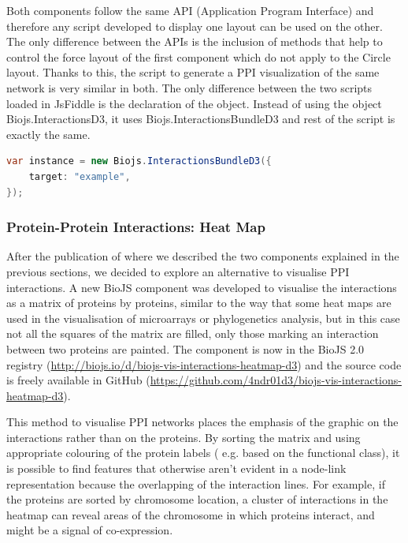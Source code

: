 Both components follow the same API (Application Program Interface) and therefore any script developed to display one layout can be used on the other. The only difference between the APIs is the inclusion of methods that help to control the force layout of the first component which do not apply to the Circle layout. Thanks to this, the script to generate a PPI visualization of the same network is very similar in both.  The only difference between the two scripts loaded in JsFiddle is the declaration of the object. Instead of using the object Biojs.InteractionsD3, it uses Biojs.InteractionsBundleD3 and rest of the script is exactly the same.
\begin{lstlisting}[language=java]
var instance = new Biojs.InteractionsBundleD3({
    target: "example",
});
\end{lstlisting}





\subsubsection{Protein-Protein Interactions: Heat Map} \label{subsubsec:ppi3_biojs}
After the publication of \cite{SAL2014} where we described the two components explained in the previous sections, we decided to explore an alternative to visualise PPI interactions. A new BioJS component was developed to visualise the interactions as a matrix of proteins by proteins, similar to the way that some heat maps are used in the visualisation of microarrays or phylogenetics analysis, but in this case not all the squares of the matrix are filled, only those marking an interaction between two proteins are painted. The component is now in the BioJS 2.0 registry (\url{http://biojs.io/d/biojs-vis-interactions-heatmap-d3}) and the source code is freely available in GitHub (\url{https://github.com/4ndr01d3/biojs-vis-interactions-heatmap-d3}).

This method to visualise PPI networks places the emphasis of the graphic on the interactions rather than on the proteins. By sorting the matrix and using appropriate colouring of the protein labels ( e.g. based on the functional class), it is possible to find features that otherwise aren't evident in a node-link representation because the overlapping of the interaction lines. For example, if the proteins are sorted by chromosome location, a cluster of interactions in the heatmap can reveal areas of the chromosome in which proteins interact, and might be a signal of co-expression.

